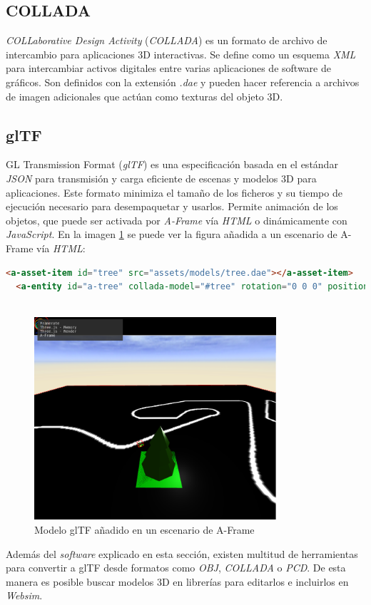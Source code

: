 \subsection{COLLADA}
\textit{COLLaborative Design Activity} (\textit{COLLADA}) es un  formato de archivo de intercambio para aplicaciones 3D interactivas. Se define como un esquema \textit{XML} para intercambiar activos digitales entre varias aplicaciones de software de gráficos. Son definidos con la extensión \textit{.dae} y pueden hacer referencia a archivos de imagen adicionales que actúan como texturas del objeto 3D. 

\subsection{glTF}
GL Transmission Format (\textit{glTF}) es una especificación basada en el estándar \textit{JSON} para transmisión y carga eficiente de escenas y modelos 3D para aplicaciones. Este formato minimiza el tamaño de los ficheros y su tiempo de ejecución necesario para desempaquetar y usarlos. Permite animación de los objetos, que puede ser activada por \textit{A-Frame} vía \textit{HTML} o dinámicamente con \textit{JavaScript}. 
En la imagen \ref{fig:tree} se puede ver la figura añadida a un escenario de A-Frame vía \textit{HTML}:

\begin{lstlisting}[language=html, caption=Código para añadir un modelo 3D personalizado a A-Frame]
 <a-asset-item id="tree" src="assets/models/tree.dae"></a-asset-item>
  <a-entity id="a-tree" collada-model="#tree" rotation="0 0 0" position="2.75 0.01 -2.27">
  
\end{lstlisting}

\begin{figure}[H]
\centering
\includegraphics[width=0.8\textwidth]{img/tree_aframe.png}
\caption{Modelo glTF añadido en un escenario de A-Frame} \label{fig:tree}
\end{figure}
Además del \textit{software} explicado en esta sección, existen multitud de herramientas para convertir a glTF desde formatos como \textit{OBJ}, \textit{COLLADA} o  \textit{PCD}\cite{bib:gltf}. De esta manera es posible buscar modelos 3D en librerías\cite{bib:sketchfab}
 para editarlos e incluirlos en \textit{Websim}.

